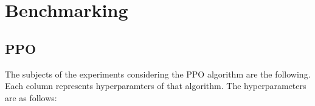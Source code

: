 \documentclass[3p,times,procedia]{elsarticle}
\begin{document}
    






\section{\textbf{Benchmarking}}

\subsection{\textbf{PPO}}
The subjects of the experiments considering the PPO algorithm are the following.
Each column represents hyperparamters of that algorithm. The hyperparameters are as follows:

\end{document}
